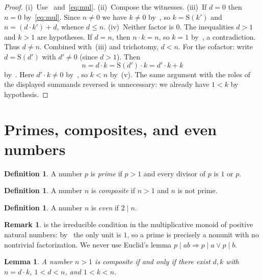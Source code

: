 \documentclass[11pt,reqno]{amsart}
\theoremstyle{plain}
\newtheorem{lemma}[theorem]{Lemma}
\theoremstyle{definition}
\newtheorem{definition}[theorem]{Definition}
\newtheorem{remark}[theorem]{Remark}
\theoremstyle{remark}
\newcommand{\Suc}{\mathrm{S}}
\numberwithin{equation}{section}
\begin{document}
\begin{proof}
(i)~Use~ and~\eqref{eq:mul}.
(ii)~Compose the witnesses.
(iii)~If \(d=0\) then \(n=0\) by~\eqref{eq:mul}. Since \(n\neq 0\) we
have \(k\neq 0\) by~, so \(k=\Suc(k')\) and
\(n=(d\cdot k')+d\), whence \(d\le n\).
(iv)~Neither factor is \(0\). The inequalities \(d>1\) and \(k>1\) are
hypotheses. If \(d=n\), then \(n\cdot k=n\), so \(k=1\)
by~, a contradiction. Thus \(d\neq n\). Combined
with~(iii) and trichotomy, \(d<n\). For the cofactor: write
\(d=\Suc(d')\) with \(d'\neq 0\) (since \(d>1\)). Then
\[
  n=d\cdot k=\Suc(d')\cdot k=d'\cdot k + k
\]
by~. Here \(d'\cdot k\neq 0\)
by~, so \(k<n\) by~(v). The same
argument with the roles of the displayed summands reversed is
unnecessary: we already have \(1<k\) by hypothesis.
\end{proof}

\section{Primes, composites, and even numbers}
\label{sec:prime}

\begin{definition}
\label{def:prime}
A number \(p\) is \emph{prime} if \(p>1\) and every divisor of \(p\)
is \(1\) or \(p\).
\end{definition}

\begin{definition}
\label{def:composite}
A number \(n\) is \emph{composite} if \(n>1\) and \(n\) is not prime.
\end{definition}

\begin{definition}
\label{def:even}
A number \(n\) is \emph{even} if \(2\mid n\).
\end{definition}

\begin{remark}
\label{rem:irreducible}
 is the irreducible condition in the multiplicative
monoid of positive natural numbers: by~ the only unit
is \(1\), so a prime is precisely a nonunit with no nontrivial
factorization. We never use Euclid's lemma
\(p\mid ab\Rightarrow p\mid a\lor p\mid b\).
\end{remark}

\begin{lemma}
\label{lem:composite-factors}
A number \(n>1\) is composite if and only if there exist \(d,k\) with
\(n=d\cdot k\), \(1<d<n\), and \(1<k<n\).
\end{lemma}
\end{document}

